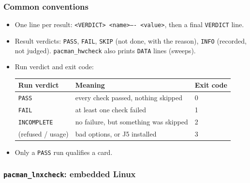 \documentclass[11pt]{article}
\begin{document}
\subsubsection{Common conventions}\label{sec:conventions}
\begin{itemize}
\item One line per result: \texttt{<VERDICT> <name>---- <value>}, then a final \texttt{VERDICT} line.
\item Result verdicts: \texttt{PASS}, \texttt{FAIL}, \texttt{SKIP} (not done, with the reason),
  \texttt{INFO} (recorded, not judged).  \texttt{pacman\_hwcheck} also prints \texttt{DATA} lines (sweeps).
\item Run verdict and exit code:
  \begin{center}
  \begin{tabular}{@{}lll@{}}
  \toprule
  Run verdict & Meaning & Exit code \\
  \midrule
  \texttt{PASS} & every check passed, nothing skipped & 0 \\
  \texttt{FAIL} & at least one check failed & 1 \\
  \texttt{INCOMPLETE} & no failure, but something was skipped & 2 \\
  (refused / usage) & bad options, or J5 installed & 3 \\
  \bottomrule
  \end{tabular}
  \end{center}
\item Only a \texttt{PASS} run qualifies a card.
\end{itemize}

\subsubsection{\texttt{pacman\_lnxcheck}: embedded Linux}
\end{document}
